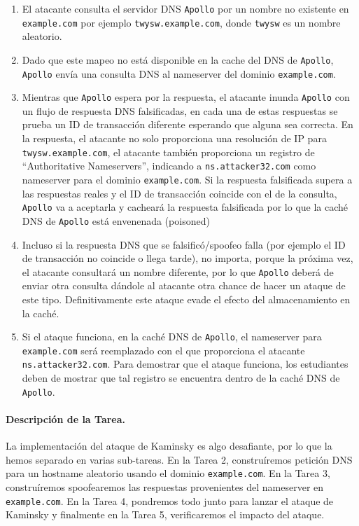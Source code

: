 \begin{enumerate}

\item El atacante consulta el servidor DNS {\tt Apollo} por un nombre no existente en {\tt example.com} por ejemplo {\tt twysw.example.com}, donde {\tt twysw} es un nombre aleatorio.
 
\item Dado que este mapeo no está disponible en la cache del DNS de {\tt Apollo},
{\tt Apollo} envía una consulta DNS al nameserver del dominio  {\tt example.com}.

\item Mientras que {\tt Apollo} espera por la respuesta, el atacante  inunda {\tt Apollo} con un flujo de respuesta DNS falsificadas, en cada una de estas respuestas se prueba un ID de transacción diferente esperando que alguna sea correcta.
En la respuesta, el atacante no solo proporciona una resolución de IP
para {\tt twysw.example.com}, el atacante también proporciona un registro de ``Authoritative Nameservers'', indicando a {\tt ns.attacker32.com} como nameserver para el dominio {\tt example.com}.
Si la respuesta falsificada supera a las respuestas reales y el ID de transacción coincide con el de la consulta, {\tt Apollo} va a aceptarla y cacheará la respuesta falsificada por lo que la caché DNS de {\tt Apollo} está envenenada (poisoned)

\item Incluso si la respuesta DNS que se falsificó/spoofeo falla (por ejemplo el ID de transacción no coincide o llega tarde), no importa, porque la próxima vez, el atacante consultará un nombre diferente, por lo que {\tt Apollo} deberá de enviar otra consulta dándole al atacante otra chance de hacer un ataque de este tipo.
Definitivamente este ataque evade el efecto del almacenamiento en la caché.

\item Si el ataque funciona, en la caché DNS de {\tt Apollo}, el nameserver para {\tt example.com} será reemplazado con el que proporciona el atacante {\tt ns.attacker32.com}.
Para demostrar que el ataque funciona, los estudiantes deben de mostrar que tal registro se encuentra dentro de la caché DNS de {\tt Apollo}.

\end{enumerate}


\paragraph{Descripción de la Tarea.} La implementación del ataque de Kaminsky es algo desafiante, por lo que la hemos separado en varias sub-tareas.
En la Tarea 2, construíremos petición DNS para un hostname aleatorio usando el dominio \texttt{example.com}. En la Tarea 3, construíremos spoofearemos las respuestas provenientes del nameserver en \texttt{example.com}. En la Tarea 4, pondremos todo junto para lanzar el ataque de Kaminsky y finalmente en la Tarea 5, verificaremos el impacto del ataque.

